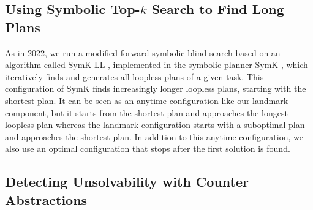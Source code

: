 \documentclass{article}
\renewcommand{\todo}[1]{} %
\begin{document}
\subsection{Using Symbolic Top-$k$ Search to Find Long Plans}

As in 2022, we run a modified forward symbolic blind search \cite{torralba-et-al-aij2017,speck-et-al-icaps2020} based on an algorithm called SymK-LL \cite{vontschammer-et-al-icaps2022}, implemented in the symbolic planner SymK \cite{speck-et-al-aaai2020}, which iteratively finds and generates all loopless plans of a given task. This configuration of SymK finds increasingly longer loopless plans, starting with the shortest plan. It can be seen as an anytime configuration like our landmark component, but it starts from the shortest plan and approaches the longest loopless plan whereas the landmark configuration starts with a suboptimal plan and approaches the shortest plan. In addition to this anytime configuration, we also use an optimal configuration that stops after the first solution is found.

\todo{\begin{itemize}
    \item As in 2022, We run a modified forward symbolic blind search \cite{torralba-et-al-aij2017,speck-et-al-icaps2020} based on an algorithm
    called SymK-LL \cite{vontschammer-et-al-icaps2022}, implemented in the symbolic
    planner SymK \cite{speck-et-al-aaai2020}, which iteratively finds and generates
    all loopless plans of a given task.
    \item This configuration of SymK finds increasingly longer loopless plans, starting with the shortest plan. It can be seen as an anytime configuration
    like our landmark component, but it starts from the shortest plan and approaches the longest loopless plan whereas the landmark configuration starts with a suboptimal plan and approaches the shortest plan.
    \item In addition to this anytime configuration, we also use an optimal configuration that stops after the first solution.
\end{itemize}}


\subsection{Detecting Unsolvability with Counter Abstractions}
\end{document}
